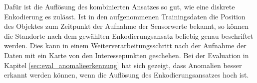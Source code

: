 Dafür ist die Auflösung des kombinierten Ansatzes so gut, wie eine diskrete Enkodierung es zulässt.
\newline
\newline
Ist in den aufgenommenen Trainingsdaten die Position des Objektes zum Zeitpunkt der Aufnahme der Sensorwerte bekannt,
so können die Standorte nach dem gewählten Enkodierungsansatz beliebig genau beschriftet werden.
Dies kann in einem Weiterverarbeitungsschritt nach der Aufnahme der Daten mit ein Karte von den Interessepunkten geschehen.
\newline
\newline
Bei der Evaluation in Kapitel \ref{sec:eval_anomalieerkennung} hat sich gezeigt, dass Anomalien besser erkannt werden können,
wenn die Auflösung des Enkodierungsansatzes hoch ist.